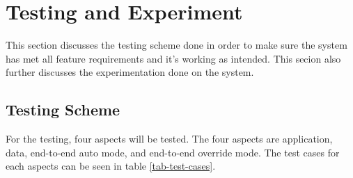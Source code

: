 \section{Testing and Experiment}

This section discusses the testing scheme done in order to make sure the system
has met all feature requirements and it's working as intended. This secion also
further discusses the experimentation done on the system.

\subsection{Testing Scheme}

For the testing, four aspects will be tested. The four aspects are application,
data, end-to-end auto mode, and end-to-end override mode. The test cases for each
aspects can be seen in table \ref{tab-test-cases}.

